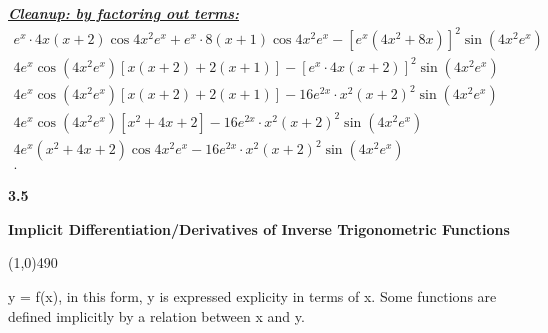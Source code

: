 \documentclass{report}
\begin{document}
  \bigbreak \noindent \bigbreak \noindent 
  \textbf{\textit{\underline{Cleanup: by factoring out terms:}}}
  \begin{align*}
    e^{x}\cdot 4x(x+2)\cos{4x^{2}e^{x}}+e^{x}\cdot 8(x+1)\cos{4x^{2}e^{x}}-[e^{x}(4x^{2}+8x)]^2\sin{(4x^{2}e^{x})} \\
    4e^{x}\cos{(4x^{2}e^{x})}[x(x+2) + 2(x+1)] - [e^{x}\cdot 4x(x+2)]^2\sin{(4x^{2}e^{x})} \\
    4e^{x}\cos{(4x^{2}e^{x})}[x(x+2) + 2(x+1)] - 16e^{2x}\cdot x^2(x+2)^2\sin{(4x^{2}e^{x})} \\
    4e^{x}\cos{(4x^{2}e^{x})}[x^{2}+4x+2] - 16e^{2x}\cdot x^2(x+2)^2\sin{(4x^{2}e^{x})} \\
    4e^{x}(x^{2}+4x+2)\cos{4x^{2}e^{x}}- 16e^{2x}\cdot x^2(x+2)^2\sin{(4x^{2}e^{x})} \\
  .\end{align*}

  \pagebreak \bigbreak \noindent
  \begin{Large}
      \begin{mdframed}
          \begin{center}
              \textbf{3.5}
          \end{center}
      \end{mdframed}
  \end{Large}
  \begin{Large}
      \begin{center}
          \textbf{Implicit Differentiation/Derivatives of Inverse Trigonometric Functions}
      \end{center}
  \end{Large}
  \line(1,0){490}
  
  \bigbreak \noindent 
  y = f(x), in this form, y is expressed explicity in terms of x. Some functions are defined implicitly by a relation between x and y.
\end{document}
